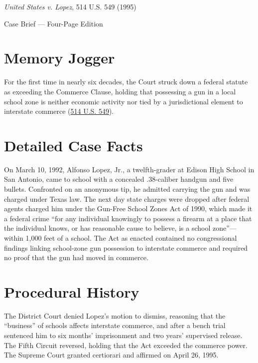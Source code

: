 \documentclass[12pt]{article}
\begin{document}
\begin{center}
{\LARGE \textit{United States v. Lopez}, 514 U.S. 549 (1995)\par}
\vspace{0.8em}
{\large Case Brief --- Four-Page Edition\par}
\end{center}
\vspace{1em}

\section{Memory Jogger}

For the first time in nearly six decades, the Court struck down a federal statute as exceeding the Commerce Clause, holding that possessing a gun in a local school zone is neither economic activity nor tied by a jurisdictional element to interstate commerce (\href{https://www.courtlistener.com/opinion/117927/united-states-v-lopez/}{514 U.S. 549}).

\section{Detailed Case Facts}

On March 10, 1992, Alfonso Lopez, Jr., a twelfth-grader at Edison High School in San Antonio, came to school with a concealed .38-caliber handgun and five bullets. Confronted on an anonymous tip, he admitted carrying the gun and was charged under Texas law. The next day state charges were dropped after federal agents charged him under the Gun-Free School Zones Act of 1990, which made it a federal crime ``for any individual knowingly to possess a firearm at a place that the individual knows, or has reasonable cause to believe, is a school zone''---within 1,000 feet of a school. The Act as enacted contained no congressional findings linking school-zone gun possession to interstate commerce and required no proof that the gun had moved in commerce.

\section{Procedural History}

The District Court denied Lopez's motion to dismiss, reasoning that the ``business'' of schools affects interstate commerce, and after a bench trial sentenced him to six months' imprisonment and two years' supervised release. The Fifth Circuit reversed, holding that the Act exceeded the commerce power. The Supreme Court granted certiorari and affirmed on April 26, 1995.
\end{document}
